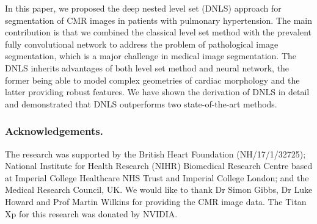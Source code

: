 \documentclass[runningheads,a4paper]{llncs}
\begin{document}
In this paper, we proposed the deep nested level set (DNLS) approach for segmentation of CMR images in patients with pulmonary hypertension. The main contribution is that we combined the classical level set method with the prevalent fully convolutional network to address the problem of pathological image segmentation, which is a major challenge in medical image segmentation. The DNLS inherits advantages of both level set method and neural network, the former being able to model complex geometries of cardiac morphology and the latter providing robust features. We have shown the derivation of DNLS in detail and demonstrated that DNLS outperforms two state-of-the-art methods. 
\subsubsection*{Acknowledgements.} 
The research was supported by the British Heart Foundation (NH/17/1/32725); National Institute for Health Research (NIHR) Biomedical Research Centre based at Imperial College Healthcare NHS Trust and Imperial College London; and the Medical Research Council, UK. We would like to thank Dr Simon Gibbs, Dr Luke Howard and Prof Martin Wilkins for providing the CMR image data. The Titan Xp for this research was donated by NVIDIA. 



\end{document}

